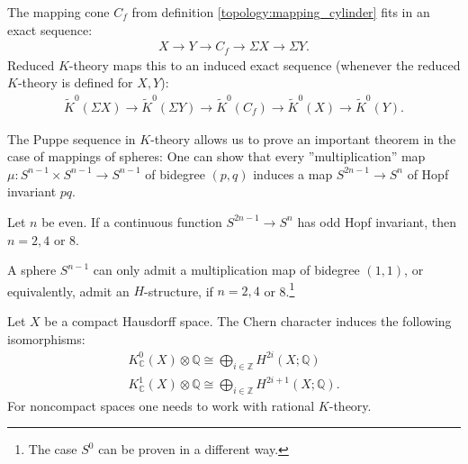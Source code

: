 {    \begin{property}
        The mapping cone $C_f$ from definition \ref{topology:mapping_cylinder} fits in an exact sequence:
        \begin{gather}
            X\longrightarrow Y\longrightarrow C_f\longrightarrow \Sigma X\longrightarrow \Sigma Y.
        \end{gather}
        Reduced $K$-theory maps this to an induced exact sequence (whenever the reduced $K$-theory is defined for $X,Y$):
        \begin{gather}
            \widetilde{K}^0(\Sigma X)\longrightarrow\widetilde{K}^0(\Sigma Y)\longrightarrow \widetilde{K}^0(C_f)\longrightarrow\widetilde{K}^0(X)\longrightarrow\widetilde{K}^0(Y).
        \end{gather}
    \end{property}
    The Puppe sequence in $K$-theory allows us to prove an important theorem in the case of mappings of spheres:
     One can show that every ''multiplication'' map $\mu: S^{n-1}\times S^{n-1}\rightarrow S^{n-1}$ of bidegree $(p,q)$ induces a map $S^{2n-1}\rightarrow S^n$ of Hopf invariant $pq$.

     \begin{theorem}
         Let $n$ be even. If a continuous function $S^{2n-1}\rightarrow S^n$ has odd Hopf invariant, then $n=2,4$ or 8.
     \end{theorem}
     \begin{result}
         A sphere $S^{n-1}$ can only admit a multiplication map of bidegree $(1,1)$, or equivalently, admit an $H$-structure, if $n=2,4$ or 8.\footnote{The case $S^0$ can be proven in a different way.}
     \end{result}

    \begin{theorem}
        Let $X$ be a compact Hausdorff space. The Chern character induces the following isomorphisms:
        \begin{gather}
            K^0_{\mathbb{C}}(X)\otimes\mathbb{Q}\cong\bigoplus_{i\in\mathbb{Z}}H^{2i}(X;\mathbb{Q})\\
            K^1_{\mathbb{C}}(X)\otimes\mathbb{Q}\cong\bigoplus_{i\in\mathbb{Z}}H^{2i+1}(X;\mathbb{Q}).
        \end{gather}
        For noncompact spaces one needs to work with rational $K$-theory.
    \end{theorem}

}
